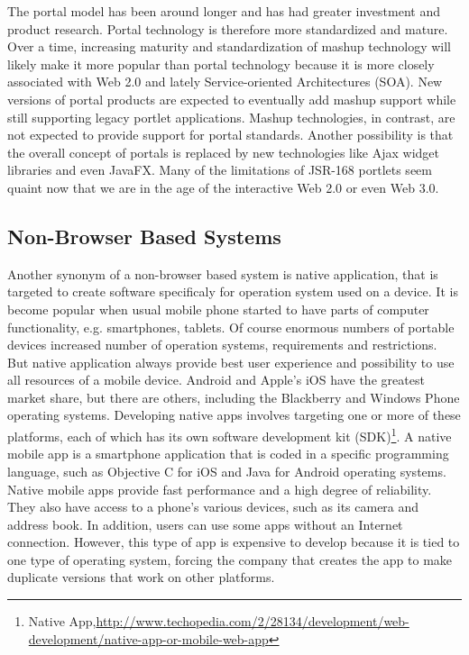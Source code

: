 	The portal model has been around longer and has had greater investment and product research. Portal technology is therefore more standardized and mature. Over a time, increasing maturity and standardization of mashup technology will likely make it more popular than portal technology because it is more closely associated with Web 2.0 and lately Service-oriented Architectures (SOA). New versions of portal products are expected to eventually add mashup support while still supporting legacy portlet applications. Mashup technologies, in contrast, are not expected to provide support for portal standards. Another possibility is that the overall concept of portals is replaced by new technologies like Ajax widget libraries and even JavaFX. Many of the limitations of JSR-168 portlets seem quaint now that we are in the age of the interactive Web 2.0 or even Web 3.0.

\subsection{Non-Browser Based Systems}
Another synonym of a non-browser based system is native application, that is targeted to create software specificaly for operation system used on a device. It is become popular when usual mobile phone started to have parts of computer functionality, e.g. smartphones, tablets. Of course enormous numbers of portable devices increased number of operation systems, requirements and restrictions. But native application always provide best user experience and possibility to use all resources of a mobile device. Android and Apple's iOS have the greatest market share, but there are others, including the Blackberry and Windows Phone operating systems. Developing native apps involves targeting one or more of these platforms, each of which has its own software development kit (SDK)\footnote{Native App,\url{http://www.techopedia.com/2/28134/development/web-development/native-app-or-mobile-web-app}}. A native mobile app is a smartphone application that is coded in a specific programming language, such as Objective C for iOS and Java for Android operating systems. Native mobile apps provide fast performance and a high degree of reliability. They also have access to a phone's various devices, such as its camera and address book. In addition, users can use some apps without an Internet connection. However, this type of app is expensive to develop because it is tied to one type of operating system, forcing the company that creates the app to make duplicate versions that work on other platforms.

